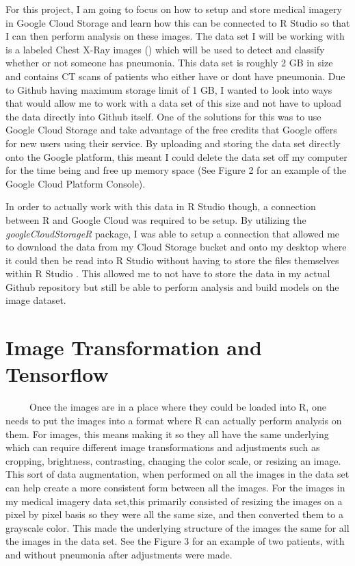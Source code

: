 \documentclass[12pt]{article}
\begin{document}
For this project, I am going to focus on how to setup and store medical
imagery in Google Cloud Storage and learn how this can be connected to R
Studio so that I can then perform analysis on these images. The data set
I will be working with is a labeled Chest X-Ray images (\citet{Medical})
which will be used to detect and classify whether or not someone has
pneumonia. This data set is roughly 2 GB in size and contains CT scans
of patients who either have or dont have pneumonia. Due to Github having
maximum storage limit of 1 GB, I wanted to look into ways that would
allow me to work with a data set of this size and not have to upload the
data directly into Github itself. One of the solutions for this was to
use Google Cloud Storage and take advantage of the free credits that
Google offers for new users using their service. By uploading and
storing the data set directly onto the Google platform, this meant I
could delete the data set off my computer for the time being and free up
memory space (See Figure 2 for an example of the Google Cloud Platform
Console).

In order to actually work with this data in R Studio though, a
connection between R and Google Cloud was required to be setup. By
utilizing the \emph{googleCloudStorageR} package, I was able to setup a
connection that allowed me to download the data from my Cloud Storage
bucket and onto my desktop where it could then be read into R Studio
without having to store the files themselves within R Studio
\citet{GoogleyR}. This allowed me to not have to store the data in my
actual Github repository but still be able to perform analysis and build
models on the image dataset.

\hypertarget{image-transformation-and-tensorflow}{%
\section{Image Transformation and
Tensorflow}\label{image-transformation-and-tensorflow}}

~~~~~Once the images are in a place where they could be loaded into R,
one needs to put the images into a format where R can actually perform
analysis on them. For images, this means making it so they all have the
same underlying which can require different image transformations and
adjustments such as cropping, brightness, contrasting, changing the
color scale, or resizing an image. This sort of data augmentation, when
performed on all the images in the data set can help create a more
consistent form between all the images. For the images in my medical
imagery data set,this primarily consisted of resizing the images on a
pixel by pixel basis so they were all the same size, and then converted
them to a grayscale color. This made the underlying structure of the
images the same for all the images in the data set. See the Figure 3 for
an example of two patients, with and without pneumonia after adjustments
were made.
\end{document}
